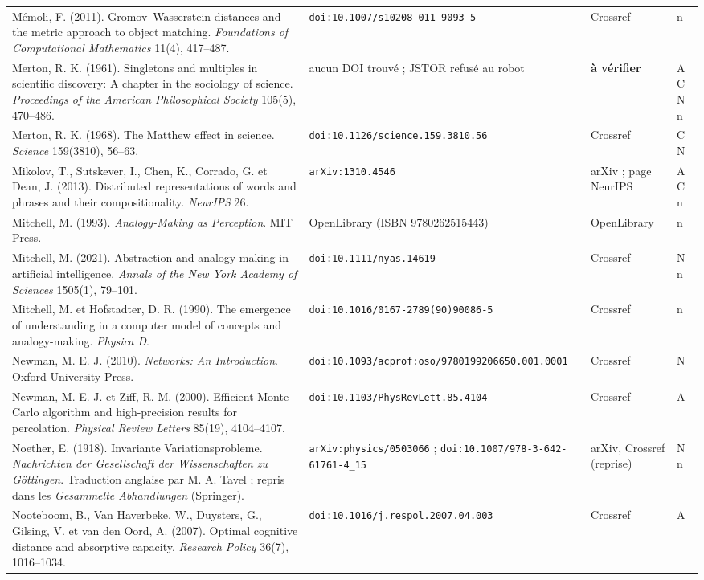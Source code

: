 \documentclass[a4paper,11pt]{article}
\begin{document}
{\begin{longtable}{@{}>{\raggedright\arraybackslash}p{8.7cm}>{\raggedright\arraybackslash}p{3.6cm}>{\raggedright\arraybackslash}p{2.1cm}>{\raggedright\arraybackslash}p{0.9cm}@{}}
Mémoli, F. (2011). Gromov--Wasserstein distances and the metric approach to object matching. \emph{Foundations of Computational Mathematics} 11(4), 417--487. & \nolinkurl{doi:10.1007/s10208-011-9093-5} & Crossref & n\\
Merton, R. K. (1961). Singletons and multiples in scientific discovery: A chapter in the sociology of science. \emph{Proceedings of the American Philosophical Society} 105(5), 470--486. & aucun DOI trouvé ; JSTOR refusé au robot & \textbf{à vérifier} & A C N n\\
Merton, R. K. (1968). The Matthew effect in science. \emph{Science} 159(3810), 56--63. & \nolinkurl{doi:10.1126/science.159.3810.56} & Crossref & C N\\
Mikolov, T., Sutskever, I., Chen, K., Corrado, G. et Dean, J. (2013). Distributed representations of words and phrases and their compositionality. \emph{NeurIPS} 26. & \nolinkurl{arXiv:1310.4546} & arXiv ; page NeurIPS & A C n\\
Mitchell, M. (1993). \emph{Analogy-Making as Perception}. MIT Press. & OpenLibrary (ISBN 9780262515443) & OpenLibrary & n\\
Mitchell, M. (2021). Abstraction and analogy-making in artificial intelligence. \emph{Annals of the New York Academy of Sciences} 1505(1), 79--101. & \nolinkurl{doi:10.1111/nyas.14619} & Crossref & N n\\
Mitchell, M. et Hofstadter, D. R. (1990). The emergence of understanding in a computer model of concepts and analogy-making. \emph{Physica D}. & \nolinkurl{doi:10.1016/0167-2789(90)90086-5} & Crossref & n\\
Newman, M. E. J. (2010). \emph{Networks: An Introduction}. Oxford University Press. & \nolinkurl{doi:10.1093/acprof:oso/9780199206650.001.0001} & Crossref & N\\
Newman, M. E. J. et Ziff, R. M. (2000). Efficient Monte Carlo algorithm and high-precision results for percolation. \emph{Physical Review Letters} 85(19), 4104--4107. & \nolinkurl{doi:10.1103/PhysRevLett.85.4104} & Crossref & A\\
Noether, E. (1918). Invariante Variationsprobleme. \emph{Nachrichten der Gesellschaft der Wissenschaften zu Göttingen}. Traduction anglaise par M. A. Tavel ; repris dans les \emph{Gesammelte Abhandlungen} (Springer). & \nolinkurl{arXiv:physics/0503066} ; \nolinkurl{doi:10.1007/978-3-642-61761-4_15} & arXiv, Crossref (reprise) & N n\\
Nooteboom, B., Van Haverbeke, W., Duysters, G., Gilsing, V. et van den Oord, A. (2007). Optimal cognitive distance and absorptive capacity. \emph{Research Policy} 36(7), 1016--1034. & \nolinkurl{doi:10.1016/j.respol.2007.04.003} & Crossref & A\\

\end{longtable}}
\end{document}
